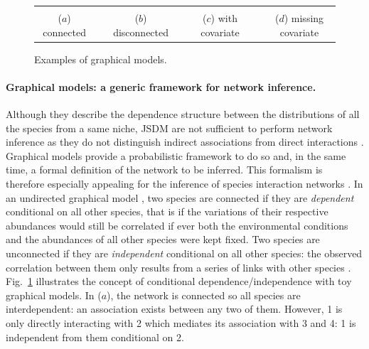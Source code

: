 \begin{figure}[H]
    \centering
    \begin{tabular}{ccccccc}
         & \qquad &
         & \qquad &
         & \qquad &
         \\
        ($a$) connected & & ($b$) disconnected & & ($c$) with covariate & & ($d$) missing covariate 
    \end{tabular}
    \caption{Examples of graphical models. }
    \label{fig:graphmodel}
\end{figure}

\paragraph{Graphical models: a generic framework for network inference.}
Although they describe the dependence structure between the distributions of all the species from a same niche, JSDM are not sufficient to perform network inference as they do not distinguish  indirect associations from direct interactions \citep{DBD18}. Graphical models \citep{Lau96} provide a probabilistic framework to do so and, in the same time, a formal definition of the network to be inferred. This formalism is therefore especially appealing for the inference of species interaction networks \citep{PWT19}.
In an undirected graphical model \citep[which is the same as a Markov random field:][]{CWL18}, two species are connected if they are {\sl dependent} conditional on all other species, that is if the variations of their respective abundances would still be  correlated if ever both the environmental conditions and the abundances of all other species were kept fixed. Two species are unconnected if they are {\sl independent} conditional on all other species: the observed correlation between them only results from a series of links with other species \citep{morueta2016network} . 
Fig.~\ref{fig:graphmodel} illustrates the concept of conditional dependence/independence with toy graphical models. In ($a$), the network is connected so all species are interdependent: an association exists between any two of them. However, 1 is only directly interacting with 2 which mediates its association with 3 and 4: 1 is independent from them conditional on 2.

